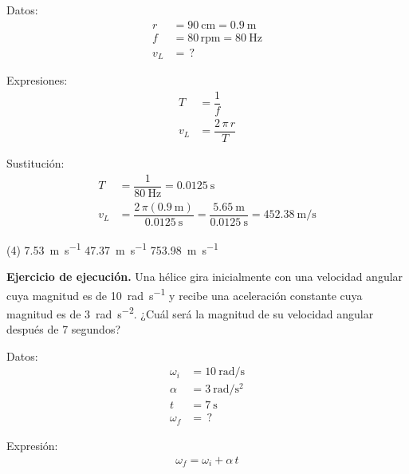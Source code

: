 \documentclass[12pt, letter]{exam}
\begin{document}
\begin{questions}
    \begin{minipage}[t]{0.35\linewidth}
    Datos: 
    \begin{align*}
    r &= \SI{90}{\centi\meter} = \SI{0.9}{\meter} \\
    f &= \num{80} \, \text{rpm} = \SI{80}{\hertz} \\
    v_{L} &= \, ?
    \end{align*}
    \end{minipage}
    \hspace{1cm}
    \begin{minipage}[t]{0.4\linewidth}
    Expresiones:
    \begin{align*}
    T &= \dfrac{1}{f} \\[0.5em]
    v_{L} &= \dfrac{2 \, \pi \, r}{T}
    \end{align*}
    \end{minipage}

    Sustitución:
    \begin{align*}
    T &= \dfrac{1}{\SI{80}{\hertz}} = \SI{0.0125}{\second} \\[0.5em]
    v_{L} &= \dfrac{2 \, \pi \left( \SI{0.9}{\meter} \right)}{\SI{0.0125}{\second}} = \dfrac{\SI{5.65}{\meter}}{\SI{0.0125}{\second}} = \SI[per-mode=fraction]{452.38}{\meter\per\second}
    \end{align*}
    \begin{tasks}(4)
        \task \SI{7.53}{\meter\per\second}
        \task \SI{47.37}{\meter\per\second}
        \task {}
        \task \SI{753.98}{\meter\per\second}
    \end{tasks}
    \setcounter{question}{16} \question \label{Ejercicio_09} \textbf{Ejercicio de ejecución. } Una hélice gira inicialmente con una velocidad angular cuya magnitud es de \SI{10}{\radian\per\second} y recibe una aceleración constante cuya magnitud es de \SI{3}{\radian\per\square\second}. ¿Cuál será la magnitud de su velocidad angular después de \num{7} segundos?

    \begin{minipage}[t]{0.35\linewidth}
    Datos: 
    \begin{align*}
    \omega_{i} &= \SI{10}{\radian\per\second} \\
    \alpha &= \SI{3}{\radian\per\square\second} \\
    t &= \SI{7}{\second} \\
    \omega_{f} &= \, ?
    \end{align*}
    \end{minipage}
    \hspace{1cm}
    \begin{minipage}[t]{0.4\linewidth}
    Expresión:
    \begin{align*}
    \omega_{f} = \omega_{i} + \alpha \, t
    \end{align*}
    \end{minipage}


\end{questions}
\end{document}
